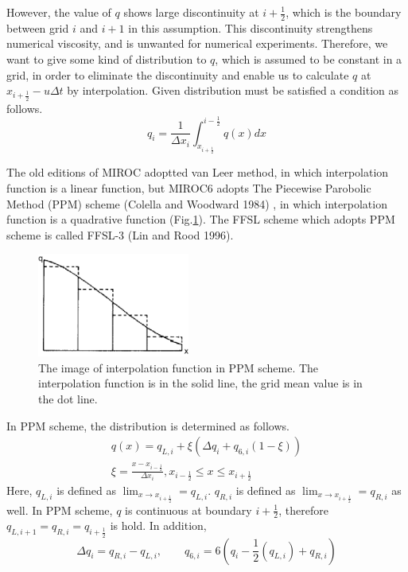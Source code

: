 \documentclass{article}
\begin{document}
However, the value of $q$ shows large discontinuity at $i+\frac{1}{2}$, which is the boundary between grid $i$ and $i+1$ in this assumption.
This discontinuity strengthens numerical viscosity, and is unwanted for numerical experiments. 
Therefore, we want to give some kind of distribution to $q$, which is assumed to be constant in a grid, in order to eliminate the discontinuity and enable us to calculate $q$ at $x_{i+\frac{1}{2}}-u\Delta t$ by interpolation.
Given distribution must be satisfied a condition as follows.
\begin{equation}
  q_{i}=\frac{1}{\Delta x_{i}} \int_{x_{i+\frac{1}{2}}}^{i-\frac{1}{2}} q(x) dx
\end{equation}

The old editions of MIROC adoptted van Leer method, in which interpolation function is a linear function, but MIROC6 adopts The Piecewise Parobolic Method (PPM) scheme (Colella and Woodward 1984) , in which interpolation function is a quadrative function (Fig.\ref{f1}). The FFSL scheme which adopts PPM scheme is called FFSL-3 (Lin and Rood 1996).

\begin{figure}
  \centering
  \includegraphics[width=5cm]{ppm_interpolate.png}
  \caption{The image of interpolation function in PPM scheme. The interpolation function is in the solid line, the grid mean value is in the dot line.}
  \label{f1}
\end{figure}

In PPM scheme, the distribution is determined as follows.
\begin{equation}
\begin{split}
\label{a4}
  q(x)=q_{L,i}+\xi (\Delta q_{i}+q_{6,i}(1-\xi))\\
  \xi=\frac{x-x_{i-\frac{1}{2}}}{\Delta x_{i}},  x_{i-\frac{1}{2}}\leq x \leq x_{i+\frac{1}{2}}
  \end{split}
\end{equation}
Here, $q_{L,i}$ is defined as $\lim_{x \to x_{i+\frac{1}{2}}}=q_{L,i}$.
$q_{R,i}$ is defined as $\lim_{x \to x_{i+\frac{1}{2}}}=q_{R,i}$ as well.
In PPM scheme, $q$ is continuous at boundary $i+\frac{1}{2}$, therefore $q_{L,i+1}=q_{R,i}=q_{i+\frac{1}{2}}$ is hold.
In addition, 
\begin{equation}
  \Delta q_{i}=q_{R,i}-q_{L,i},\qquad q_{6,i}=6(q_{i}-\frac{1}{2}(q_{L,i})+q_{R,i})
\end{equation}
\end{document}
